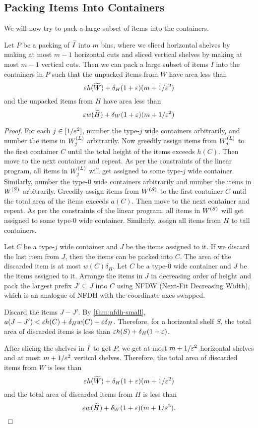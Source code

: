 \subsection{Packing Items Into Containers}
\label{sec:bp-algo:pack-into-containers}

We will now try to pack a large subset of items into the containers.

\begin{lemma}
\label{thm:discard-area-ub}
Let $P$ be a packing of $\widetilde{I}$ into $m$ bins, where we sliced horizontal shelves by making
at most $m-1$ horizontal cuts and sliced vertical shelves by making at most $m-1$ vertical cuts.
Then we can pack a large subset of items $I$ into the containers in $P$ such that
the unpacked items from $W$ have area less than
\[ \varepsilon h(\widetilde{W}) + \delta_H(1 + \varepsilon)(m + 1/\varepsilon^2) \]
and the unpacked items from $H$ have area less than
\[ \varepsilon w(\widetilde{H}) + \delta_W(1 + \varepsilon)(m + 1/\varepsilon^2) \]
\end{lemma}
\begin{proof}
For each $j \in [1/\varepsilon^2]$, number the type-$j$ wide containers arbitrarily,
and number the items in $W^{(L)}_j$ arbitrarily.
Now greedily assign items from $W^{(L)}_j$ to the first container $C$ until the total height
of the items exceeds $h(C)$. Then move to the next container and repeat.
As per the constraints of the linear program, all items in $W^{(L)}_j$
will get assigned to some type-$j$ wide container.
Similarly, number the type-0 wide containers arbitrarily
and number the items in $W^{(S)}$ arbitrarily.
Greedily assign items from $W^{(S)}$ to the first container $C$ until the total area
of the items exceeds $a(C)$. Then move to the next container and repeat.
As per the constraints of the linear program, all items in $W^{(S)}$
will get assigned to some type-0 wide container.
Similarly, assign all items from $H$ to tall containers.

Let $C$ be a type-$j$ wide container and $J$ be the items assigned to it.
If we discard the last item from $J$, then the items can be packed into $C$.
The area of the discarded item is at most $w(C)\delta_H$.
Let $C$ be a type-0 wide container and $J$ be the items assigned to it.
Arrange the items in $J$ in decreasing order of height and pack the largest
prefix $J' \subseteq J$ into $C$ using NFDW (Next-Fit Decreasing Width),
which is an analogue of NFDH with the coordinate axes swapped.

Discard the items $J - J'$. By \cref{thm:nfdh-small},
$a(J - J') < \varepsilon h(C) + \delta_H w(C) + \varepsilon\delta_H$.
Therefore, for a horizontal shelf $S$, the total area of discarded items is less than
$\varepsilon h(S) + \delta_H(1 + \varepsilon)$.

After slicing the shelves in $\widetilde{I}$ to get $P$,
we get at most $m + 1/\varepsilon^2$ horizontal shelves
and at most $m + 1/\varepsilon^2$ vertical shelves.
Therefore, the total area of discarded items from $W$ is less than
\[ \varepsilon h(\widetilde{W}) + \delta_H(1 + \varepsilon)(m + 1/\varepsilon^2) \]
and the total area of discarded items from $H$ is less than
\[ \varepsilon w(\widetilde{H}) + \delta_W(1 + \varepsilon)(m + 1/\varepsilon^2). \qedhere \]
\end{proof}

